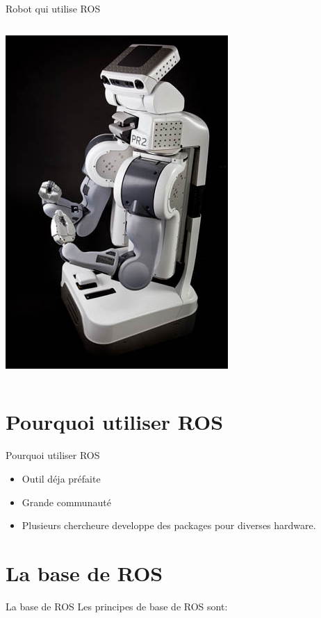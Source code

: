 \documentclass{beamer}
\begin{document}
\begin{frame}{Robot qui utilise ROS}
\begin{columns}
	\includegraphics[width=\textwidth]{PR2.jpg}
\end{columns}
\end{frame}

\section{Pourquoi utiliser ROS}

\begin{frame}{Pourquoi utiliser ROS}
	\begin{itemize}
		\item Outil déja préfaite
		\item Grande communauté
		\item Plusieurs chercheure developpe des packages pour diverses hardware.
	\end{itemize}
\end{frame}

\section{La base de ROS}

\begin{frame}{La base de ROS}
Les principes de base de ROS sont:
\begin{itemize}
\end{itemize}
\end{frame}
\end{document}
